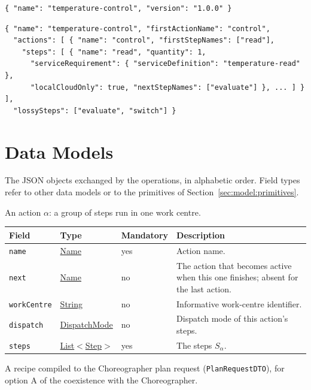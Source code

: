 \documentclass[a4paper]{arrowhead}
\newcommand{\mref}[1]{{\textcolor{ArrowheadPurple}{\hyperref[sec:model:#1]{#1}}}}
\newcommand{\pref}[1]{{\textcolor{ArrowheadGrey}{\hyperref[sec:model:primitives:#1]{#1}}}}
\begin{document}
\begin{lstlisting}[caption={Example request body}]
{ "name": "temperature-control", "version": "1.0.0" }
\end{lstlisting}


\begin{lstlisting}[caption={Example response body}]
{ "name": "temperature-control", "firstActionName": "control",
  "actions": [ { "name": "control", "firstStepNames": ["read"],
    "steps": [ { "name": "read", "quantity": 1,
      "serviceRequirement": { "serviceDefinition": "temperature-read" },
      "localCloudOnly": true, "nextStepNames": ["evaluate"] }, ... ] } ],
  "lossySteps": ["evaluate", "switch"] }
\end{lstlisting}


\newpage
\section{Data Models}
\label{sec:model}
The JSON objects exchanged by the operations, in alphabetic order. Field types refer to other data models or to the
primitives of Section~\ref{sec:model:primitives}.

An action $\alpha$: a group of steps run in one work centre.

{\small
\begin{longtable}{|p{3.7cm}|p{4.2cm}|p{1.6cm}|p{6.3cm}|}

\hline
\rowcolor{gray!33} Field & Type & Mandatory & Description \\ \hline
\endhead
\texttt{name} & \pref{Name} & yes & Action name. \\ \hline
\texttt{next} & \pref{Name} & no & The action that becomes active when this one finishes; absent for the last action. \\ \hline
\texttt{workCentre} & \pref{String} & no & Informative work-centre identifier. \\ \hline
\texttt{dispatch} & \mref{DispatchMode} & no & Dispatch mode of this action's steps. \\ \hline
\texttt{steps} & \pref{List}$<$\mref{Step}$>$ & yes & The steps $S_\alpha$. \\ \hline
\end{longtable}
}

A recipe compiled to the Choreographer plan request (\texttt{PlanRequestDTO}), for option A of the coexistence with the Choreographer.
\end{document}
